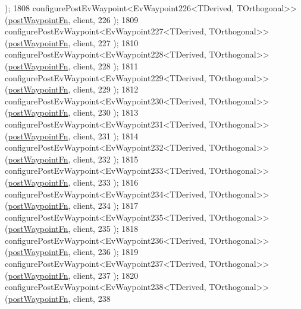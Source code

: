 \begin{DoxyCode}
      );
1808     configurePostEvWaypoint<EvWaypoint226<TDerived, TOrthogonal>>(\hyperlink{classcl__move__base__z_1_1WaypointEventDispatcher_a964a57fcce5d48ec60243230722d8dd7}{postWaypointFn}, client, 226
      );
1809     configurePostEvWaypoint<EvWaypoint227<TDerived, TOrthogonal>>(\hyperlink{classcl__move__base__z_1_1WaypointEventDispatcher_a964a57fcce5d48ec60243230722d8dd7}{postWaypointFn}, client, 227
      );
1810     configurePostEvWaypoint<EvWaypoint228<TDerived, TOrthogonal>>(\hyperlink{classcl__move__base__z_1_1WaypointEventDispatcher_a964a57fcce5d48ec60243230722d8dd7}{postWaypointFn}, client, 228
      );
1811     configurePostEvWaypoint<EvWaypoint229<TDerived, TOrthogonal>>(\hyperlink{classcl__move__base__z_1_1WaypointEventDispatcher_a964a57fcce5d48ec60243230722d8dd7}{postWaypointFn}, client, 229
      );
1812     configurePostEvWaypoint<EvWaypoint230<TDerived, TOrthogonal>>(\hyperlink{classcl__move__base__z_1_1WaypointEventDispatcher_a964a57fcce5d48ec60243230722d8dd7}{postWaypointFn}, client, 230
      );
1813     configurePostEvWaypoint<EvWaypoint231<TDerived, TOrthogonal>>(\hyperlink{classcl__move__base__z_1_1WaypointEventDispatcher_a964a57fcce5d48ec60243230722d8dd7}{postWaypointFn}, client, 231
      );
1814     configurePostEvWaypoint<EvWaypoint232<TDerived, TOrthogonal>>(\hyperlink{classcl__move__base__z_1_1WaypointEventDispatcher_a964a57fcce5d48ec60243230722d8dd7}{postWaypointFn}, client, 232
      );
1815     configurePostEvWaypoint<EvWaypoint233<TDerived, TOrthogonal>>(\hyperlink{classcl__move__base__z_1_1WaypointEventDispatcher_a964a57fcce5d48ec60243230722d8dd7}{postWaypointFn}, client, 233
      );
1816     configurePostEvWaypoint<EvWaypoint234<TDerived, TOrthogonal>>(\hyperlink{classcl__move__base__z_1_1WaypointEventDispatcher_a964a57fcce5d48ec60243230722d8dd7}{postWaypointFn}, client, 234
      );
1817     configurePostEvWaypoint<EvWaypoint235<TDerived, TOrthogonal>>(\hyperlink{classcl__move__base__z_1_1WaypointEventDispatcher_a964a57fcce5d48ec60243230722d8dd7}{postWaypointFn}, client, 235
      );
1818     configurePostEvWaypoint<EvWaypoint236<TDerived, TOrthogonal>>(\hyperlink{classcl__move__base__z_1_1WaypointEventDispatcher_a964a57fcce5d48ec60243230722d8dd7}{postWaypointFn}, client, 236
      );
1819     configurePostEvWaypoint<EvWaypoint237<TDerived, TOrthogonal>>(\hyperlink{classcl__move__base__z_1_1WaypointEventDispatcher_a964a57fcce5d48ec60243230722d8dd7}{postWaypointFn}, client, 237
      );
1820     configurePostEvWaypoint<EvWaypoint238<TDerived, TOrthogonal>>(\hyperlink{classcl__move__base__z_1_1WaypointEventDispatcher_a964a57fcce5d48ec60243230722d8dd7}{postWaypointFn}, client, 238

\end{DoxyCode}
